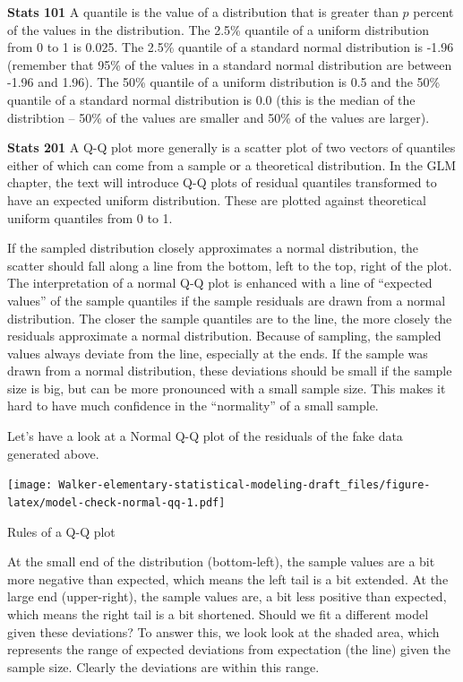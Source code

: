 \documentclass[]{book}
\begin{document}
\textbf{Stats 101} A quantile is the value of a distribution that is
greater than \(p\) percent of the values in the distribution. The 2.5\%
quantile of a uniform distribution from 0 to 1 is 0.025. The 2.5\%
quantile of a standard normal distribution is -1.96 (remember that 95\%
of the values in a standard normal distribution are between -1.96 and
1.96). The 50\% quantile of a uniform distribution is 0.5 and the 50\%
quantile of a standard normal distribution is 0.0 (this is the median of
the distribtion -- 50\% of the values are smaller and 50\% of the values
are larger).

\textbf{Stats 201} A Q-Q plot more generally is a scatter plot of two
vectors of quantiles either of which can come from a sample or a
theoretical distribution. In the GLM chapter, the text will introduce
Q-Q plots of residual quantiles transformed to have an expected uniform
distribution. These are plotted against theoretical uniform quantiles
from 0 to 1.

If the sampled distribution closely approximates a normal distribution,
the scatter should fall along a line from the bottom, left to the top,
right of the plot. The interpretation of a normal Q-Q plot is enhanced
with a line of ``expected values'' of the sample quantiles if the sample
residuals are drawn from a normal distribution. The closer the sample
quantiles are to the line, the more closely the residuals approximate a
normal distribution. Because of sampling, the sampled values always
deviate from the line, especially at the ends. If the sample was drawn
from a normal distribution, these deviations should be small if the
sample size is big, but can be more pronounced with a small sample size.
This makes it hard to have much confidence in the ``normality'' of a
small sample.

Let's have a look at a Normal Q-Q plot of the residuals of the fake data
generated above.

\texttt{[image: Walker-elementary-statistical-modeling-draft\_files/figure-latex/model-check-normal-qq-1.pdf]}

Rules of a Q-Q plot

At the small end of the distribution (bottom-left), the sample values
are a bit more negative than expected, which means the left tail is a
bit extended. At the large end (upper-right), the sample values are, a
bit less positive than expected, which means the right tail is a bit
shortened. Should we fit a different model given these deviations? To
answer this, we look look at the shaded area, which represents the range
of expected deviations from expectation (the line) given the sample
size. Clearly the deviations are within this range.
\end{document}
